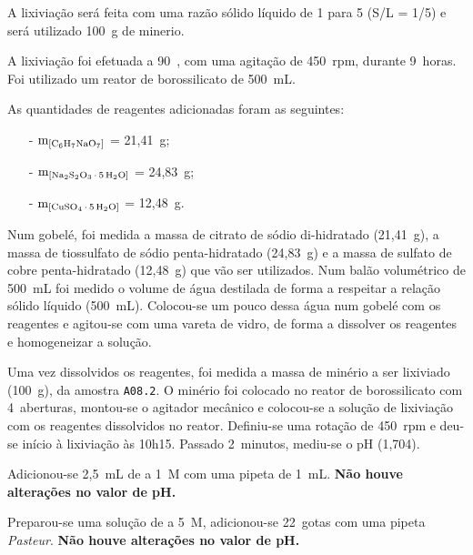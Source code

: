 A lixiviação será feita com uma razão sólido líquido de 1 para 5 (S/L = 1/5) e será utilizado 100~g de minerio.

A lixiviação foi efetuada a 90~\graus{}, com uma agitação de 450~rpm, durante 9~horas.
Foi utilizado um reator de borossilicato de 500~mL.

As quantidades de reagentes adicionadas foram as seguintes:
\begin{itemize}
    \item[-] $\mathrm{m}_{\left[\citratodi{}\right]}$ = 21,41~g;
    \item[-] $\mathrm{m}_{\left[\tsp{}\right]}$ = 24,83~g;
    \item[-] $\mathrm{m}_{\left[\sulfcu{}\right]}$ = 12,48~g.
\end{itemize}

Num gobelé, foi medida a massa de citrato de sódio di-hidratado (21,41~g), a massa de tiossulfato de sódio penta-hidratado (24,83~g) e a massa de sulfato de cobre penta-hidratado (12,48~g) que vão ser utilizados.
Num balão volumétrico de 500~mL foi medido o volume de água destilada de forma a respeitar a relação sólido líquido (500~mL).
Colocou-se um pouco dessa água num gobelé com os reagentes e agitou-se com uma vareta de vidro, de forma a dissolver os reagentes e homogeneizar a solução.

Uma vez dissolvidos os reagentes, foi medida a massa de minério a ser lixiviado (100~g), da amostra \texttt{A08.2}.
O minério foi colocado no reator de borossilicato com 4~aberturas, montou-se o agitador mecânico e colocou-se a solução de lixiviação com os reagentes dissolvidos no reator.
Definiu-se uma rotação de 450~rpm e deu-se início à lixiviação às 10h15.
Passado 2~minutos, mediu-se o pH (1,704).

Adicionou-se 2,5~mL de \hidso{} a 1~M com uma pipeta de 1~mL. 
\textbf{Não houve alterações no valor de pH.}


Preparou-se uma solução de \hidso{} a 5~M, adicionou-se 22~gotas com uma pipeta \emph{Pasteur}.
\textbf{Não houve alterações no valor de pH.}

